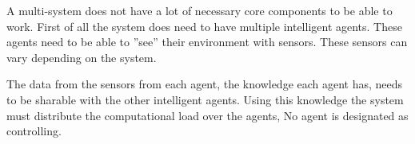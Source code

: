 
A multi-system does not have a lot of necessary core components to be able to work. First
of all the system does need to have multiple intelligent agents. These agents need to be
able to ”see” their environment with sensors. These sensors can vary depending on the
system.

The data from the sensors from each agent, the knowledge each agent has, needs to be
sharable with the other intelligent agents. Using this knowledge the system must distribute
the computational load over the agents, No agent is designated as controlling.